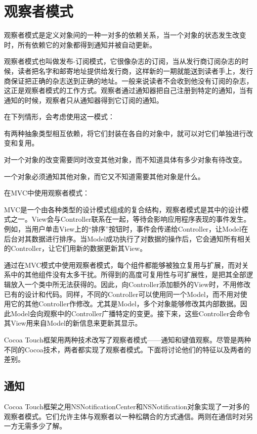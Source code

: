 \documentclass[a4paper, 12pt]{article}
\begin{document}
\newpage

\section{观察者模式}
观察者模式是定义对象间的一种一对多的依赖关系，当一个对象的状态发生改变时，所有依赖它的对象都得到通知并被自动更新。

观察者模式也叫做发布-订阅模式，它很像杂志的订阅，当从发行商订阅杂志的时候，读者把名字和邮寄地址提供给发行商，这样新的一期就能送到读者手上，发行商保证把正确的杂志送到正确的地址。一般来说读者不会收到他没有订阅的杂志，这正是观察者模式的工作方式。观察者通过通知器把自己注册到特定的通知，当有通知的时候，观察者只从通知器得到它订阅的通知。

在下列情形，会考虑使用这一模式：

有两种抽象类型相互依赖，将它们封装在各自的对象中，就可以对它们单独进行改变和复用。

对一个对象的改变需要同时改变其他对象，而不知道具体有多少对象有待改变。

一个对象必须通知其他对象，而它又不知道需要其他对象是什么。

在MVC中使用观察者模式：

MVC是一个由各种类型的设计模式组成的复合结构，观察者模式是其中的设计模式之一。View会与Controller联系在一起，等待会影响应用程序表现的事件发生。例如，当用户单击View上的“排序”按钮时，事件会传递给Controller，让Model在后台对其数据进行排序。当Model成功执行了对数据的操作后，它会通知所有相关的Controller，让它们用新的数据更新其View。

通过在MVC模式中使用观察者模式，每个组件都能够被独立复用与扩展，而对关系中的其他组件没有太多干扰。所得到的高度可复用性与可扩展性，是把其全部逻辑放入一个类中所无法获得的。因此，向Controller添加额外的View时，不用修改已有的设计和代码。同样，不同的Controller可以使用同一个Model，而不用对使用它的其他Controller作修改。尤其是Model，多个对象能够修改其内部数据。因此Model会向观察中的Controller广播特定的变更。接下来，这些Controller会命令其View用来自Model的新信息来更新其显示。

Cocoa Touch框架用两种技术改写了观察者模式——通知和键值观察。尽管是两种不同的Cocoa技术，两者都实现了观察者模式。下面将讨论他们的特征以及两者的差别。

\subsection{通知}
Cocoa Touch框架之用NSNotificationCenter和NSNotification对象实现了一对多的观察者模式。它们允许主体与观察者以一种松耦合的方式通信。两则在通信时对另一方无需多少了解。
\end{document}
